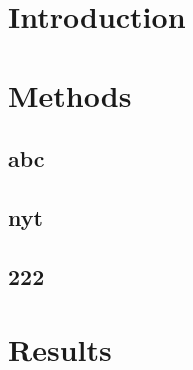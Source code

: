 \documentclass[12pt]{article}
\begin{document}
\section{Introduction}

\section{Methods}

\subsection{abc}
\subsection{nyt}
\subsection{222}

\section{Results}
\end{document}

